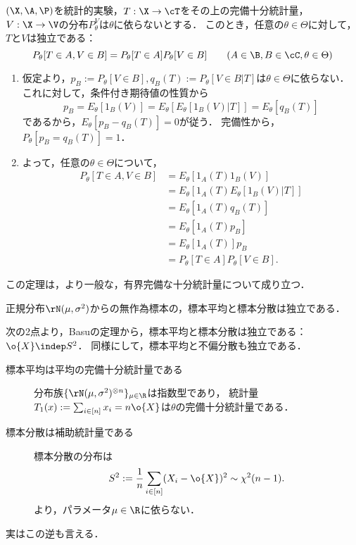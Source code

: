 \documentclass[uplatex,dvipdfmx]{jsreport}
\begin{document}
\begin{theorem}
    $(\X,\A,\P)$を統計的実験，$T:\X\to\cT$をその上の完備十分統計量，$V:\X\to\V$の分布$P^V_\theta$は$\theta$に依らないとする．
    このとき，任意の$\theta\in\Theta$に対して，$T$と$V$は独立である：
    \[P_\theta[T\in A,V\in B]=P_\theta[T\in A]P_\theta[V\in B]\qquad(A\in\B,B\in\cC,\theta\in\Theta)\]
\end{theorem}
\begin{Proof}\mbox{}
    \begin{enumerate}[{Step}1]
        \item 仮定より，$p_B:=P_\theta[V\in B],q_B(T):=P_\theta[V\in B|T]$は$\theta\in\Theta$に依らない．
        これに対して，条件付き期待値の性質から
        \[p_B=E_\theta[1_B(V)]=E_\theta[E_\theta[1_B(V)|T]]=E_\theta[q_B(T)]\]
        であるから，$E_\theta[p_B-q_B(T)]=0$が従う．
        完備性から，$P_\theta[p_B=q_B(T)]=1$．
        \item よって，任意の$\theta\in\Theta$について，
        \begin{align*}
            P_\theta[T\in A,V\in B]&=E_\theta[1_A(T)1_B(V)]\\
            &=E_\theta[1_A(T)E_\theta[1_B(V)|T]]\\
            &=E_\theta[1_A(T)q_B(T)]\\
            &=E_\theta[1_A(T)p_B]\\
            &=E_\theta[1_A(T)]p_B\\
            &=P_\theta[T\in A]P_\theta[V\in B].
        \end{align*}
    \end{enumerate}
\end{Proof}
\begin{remark}[Basuの定理の一般化]
    この定理は，より一般な，有界完備な十分統計量について成り立つ．
\end{remark}

\begin{corollary}
    正規分布$\rN(\mu,\sigma^2)$からの無作為標本の，標本平均と標本分散は独立である．
\end{corollary}
\begin{Proof}
    次の2点より，Basuの定理から，標本平均と標本分散は独立である：$\o{X}\indep S^2$．
    同様にして，標本平均と不偏分散も独立である．
    \begin{description}
        \item[標本平均は平均の完備十分統計量である] 
        分布族$\{\rN(\mu,\sigma^2)^{\otimes n}\}_{\mu\in\R}$は指数型であり，
        統計量$T_1(x):=\sum_{i\in[n]}x_i=n\o{X}$は$\theta$の完備十分統計量である．
        \item[標本分散は補助統計量である] 標本分散の分布は
        \[S^2:=\frac{1}{n}\sum_{i\in[n]}(X_i-\o{X})^2\sim\chi^2(n-1).\]
        より，パラメータ$\mu\in\R$に依らない．
    \end{description}
\end{Proof}
\begin{remark}
    実はこの逆も言える\cite{Kawata-Sakamoto49}．
\end{remark}
\end{document}
